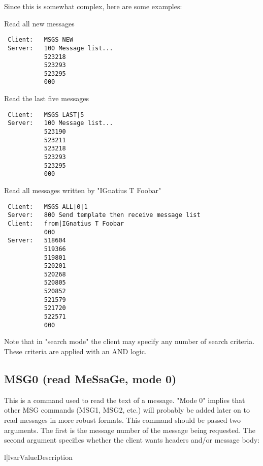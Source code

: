  Since this is somewhat complex, here are some examples:

  Read all new messages

\begin{verbatim}
 Client:   MSGS NEW
 Server:   100 Message list...
           523218
           523293
           523295
           000
\end{verbatim}

  Read the last five messages

\begin{verbatim}
 Client:   MSGS LAST|5
 Server:   100 Message list...
           523190
           523211
           523218
           523293
           523295
           000
\end{verbatim}

  Read all messages written by "IGnatius T Foobar"

\begin{verbatim}
 Client:   MSGS ALL|0|1
 Server:   800 Send template then receive message list
 Client:   from|IGnatius T Foobar
           000
 Server:   518604
           519366
           519801
           520201
           520268
           520805
           520852
           521579
           521720
           522571
           000
\end{verbatim}

 Note that in "search mode" the client may specify any number of search
criteria.  These criteria are applied with an AND logic.



\subsection{MSG0 (read MeSsaGe, mode 0)}

 This is a command used to read the text of a message.  "Mode 0" implies that
other MSG commands (MSG1, MSG2, etc.) will probably be added later on to read
messages in more robust formats.  This command should be passed two arguments.
The first is the message number of the message being requested.  The second
argument specifies whether the client wants headers and/or message body:

\begin{tableii}{l|l}{var}{Value}{Description}





\end{tableii}

